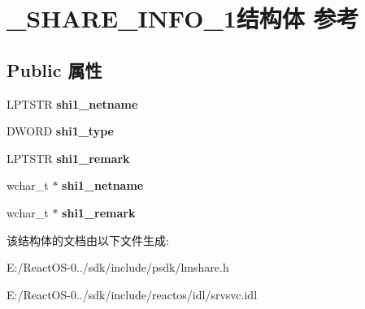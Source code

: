 \hypertarget{struct___s_h_a_r_e___i_n_f_o__1}{}\section{\+\_\+\+S\+H\+A\+R\+E\+\_\+\+I\+N\+F\+O\+\_\+1结构体 参考}
\label{struct___s_h_a_r_e___i_n_f_o__1}
\subsection*{Public 属性}
\begin{DoxyCompactItemize}
\item 
\mbox{\label{struct___s_h_a_r_e___i_n_f_o__1_a4c219d5f3d236336e950b80128250327}} 
L\+P\+T\+S\+TR {\bfseries shi1\+\_\+netname}
\item 
\mbox{\label{struct___s_h_a_r_e___i_n_f_o__1_a1d7547db24726957ceee4668f45f5f8f}} 
D\+W\+O\+RD {\bfseries shi1\+\_\+type}
\item 
\mbox{\label{struct___s_h_a_r_e___i_n_f_o__1_a35ff6b5429df5e2639610927e1a3924f}} 
L\+P\+T\+S\+TR {\bfseries shi1\+\_\+remark}
\item 
\mbox{\label{struct___s_h_a_r_e___i_n_f_o__1_a024b84e01be3d49ad63652ac78d6eb8a}} 
wchar\+\_\+t $\ast$ {\bfseries shi1\+\_\+netname}
\item 
\mbox{\label{struct___s_h_a_r_e___i_n_f_o__1_a30a2b711b60ca5b28ab1d1e068a1dc43}} 
wchar\+\_\+t $\ast$ {\bfseries shi1\+\_\+remark}
\end{DoxyCompactItemize}


该结构体的文档由以下文件生成\+:\begin{DoxyCompactItemize}
\item 
E\+:/\+React\+O\+S-\/0../sdk/include/psdk/lmshare.\+h\item 
E\+:/\+React\+O\+S-\/0../sdk/include/reactos/idl/srvsvc.\+idl\end{DoxyCompactItemize}
